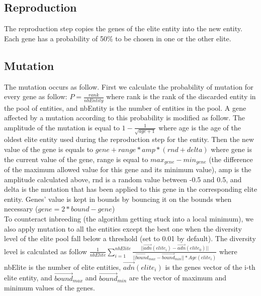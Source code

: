 \subsection{Reproduction}

The reproduction step copies the genes of the elite entity into the new entity. Each gene has a probability of 50\% to be chosen in one or the other elite.\\

\subsection{Mutation}

The mutation occurs as follow. First we calculate the probability of mutation for every gene as follow: $P=\frac{rank}{nbEntity}$ where rank is the rank of the discarded entity in the pool of entities, and nbEntity is the number of entities in the pool. A gene affected by a mutation according to this probability is modified as follow. The amplitude of the mutation is equal to $1-\frac{1}{\sqrt{age+1}}$ where age is the age of the oldest elite entity used during the reproduction step for the entity. Then the new value of the gene is equals to $gene+range*amp*(rnd+delta)$ where gene is the current value of the gene, range is equal to $max_{gene}-min_{gene}$ (the difference of the maximum allowed value for this gene and its minimum value), amp is the amplitude calculated above, rnd is a random value between -0.5 and 0.5, and delta is the mutation that has been applied to this gene in the corresponding elite entity. Genes' value is kept in bounds by bouncing it on the bounds when necessary ($gene=2*bound-gene$)\\

To counteract inbreeding (the algorithm getting stuck into a local minimum), we also apply mutation to all the entities except the best one when the diversity level of the elite pool fall below a threshold (set to 0.01 by default). The diversity level is calculated as follow $\frac{1}{nbElite}\sum_{i=1}^{nbElite}\frac{||\overrightarrow{adn}(elite_i)-\overrightarrow{adn}(elite_0)||}{||\overrightarrow{bound}_{max}-\overrightarrow{bound}_{min}||*Age(elite_i)}$ where nbElite is the number of elite entities, $\overrightarrow{adn}(elite_i)$ is the genes vector of the i-th elite entity, and $\overrightarrow{bound}_{max}$ and $\overrightarrow{bound}_{min}$ are the vector of maximum and minimum values of the genes.\\ 

